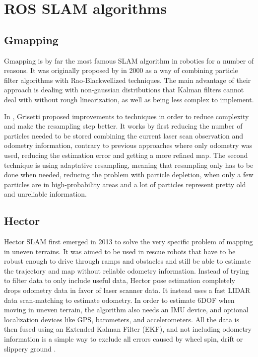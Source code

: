 \section{ROS SLAM algorithms}

\subsection{Gmapping}

Gmapping is by far the most famous SLAM algorithm in robotics for a number of reasons. It was originally proposed by \citeauthor{doucet2000rao} in 2000 as a way of combining particle filter algorithms with Rao-Blackwellized techniques. The main advantage of their approach is dealing with non-gaussian distributions that Kalman filters cannot deal with without rough linearization, as well as being less complex to implement.

In \cite{grisetti2007improved}, Grisetti proposed improvements to \citeauthor{doucet2000rao} techniques in order to reduce complexity and make the resampling step better. It works by first reducing the number of particles needed to be stored combining the current laser scan observation and odometry information, contrary to previous approaches where only odometry was used, reducing the estimation error and getting a more refined map. The second technique is using adaptative resampling, meaning that resampling only has to be done when needed, reducing the problem with particle depletion, when only a few particles are in high-probability areas and a lot of particles represent pretty old and unreliable information.

\subsection{Hector}

Hector SLAM first emerged in 2013 to solve the very specific problem of mapping in uneven terrains. It was aimed to be used in rescue robots that have to be robust enough to drive through ramps and obstacles and still be able to estimate the trajectory and map without reliable odometry information. Instead of trying to filter data to only include useful data, Hector pose estimation completely drops odometry data in favor of laser scanner data. It instead uses a fast LIDAR data scan-matching to estimate odometry. In order to estimate 6DOF when moving in uneven terrain, the algorithm also needs an IMU device, and optional localization devices like GPS, barometers, and accelerometers. All the data is then fused using an Extended Kalman Filter (EKF), and not including odometry information is a simple way to exclude all errors caused by wheel spin, drift or slippery ground \cite{kohlbrecher2011flexible}.

